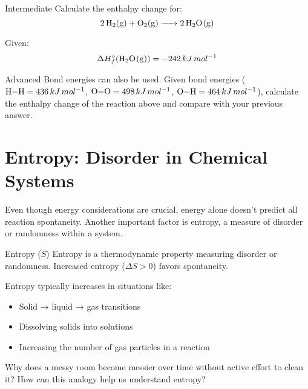 \begin{tieredquestions}{Intermediate}
Calculate the enthalpy change for:
\[
\ce{2H2(g) + O2(g) -> 2H2O(g)}
\]

Given:
\[
\Delta H_f^\circ(\ce{H2O(g)}) = -242\,kJ\,mol^{-1}
\]
\end{tieredquestions}

\begin{tieredquestions}{Advanced}
Bond energies can also be used. Given bond energies (\(\ce{H-H}=436\,kJ\,mol^{-1}\), \(\ce{O=O}=498\,kJ\,mol^{-1}\), \(\ce{O-H}=464\,kJ\,mol^{-1}\)), calculate the enthalpy change of the reaction above and compare with your previous answer.
\end{tieredquestions}

\FloatBarrier

\section{Entropy: Disorder in Chemical Systems}
\FloatBarrier
\FloatBarrier
\FloatBarrier

Even though energy considerations are crucial, energy alone doesn't predict all reaction spontaneity. Another important factor is entropy, a measure of disorder or randomness within a system.


\begin{keyconcept}{Entropy (\(S\))}
Entropy is a thermodynamic property measuring disorder or randomness. Increased entropy (\(\Delta S > 0\)) favors spontaneity.
\end{keyconcept}

Entropy typically increases in situations like:
\begin{itemize}
    \item Solid → liquid → gas transitions
    \item Dissolving solids into solutions
    \item Increasing the number of gas particles in a reaction
\end{itemize}

\begin{stopandthink}
Why does a messy room become messier over time without active effort to clean it? How can this analogy help us understand entropy?
\end{stopandthink}

